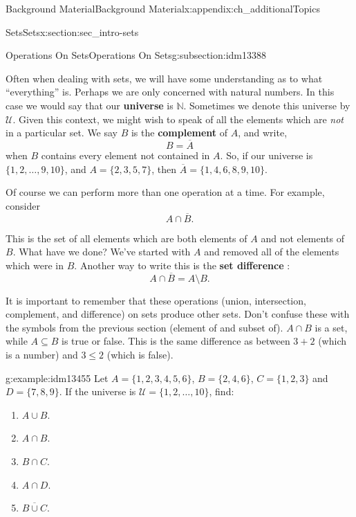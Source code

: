 \documentclass[oneside,10pt,]{book}
\newcommand{\terminology}[1]{\textbf{#1}}
\numberwithin{equation}{chapter}
\def\N{\mathbb N}
\def\U{\mathcal U}
\begin{document}
\begin{appendixptx}{Background Material}{}{Background Material}{}{}{x:appendix:ch_additionalTopics}
\begin{sectionptx}{Sets}{}{Sets}{}{}{x:section:sec_intro-sets}
\begin{subsectionptx}{Operations On Sets}{}{Operations On Sets}{}{}{g:subsection:idm13388}
\par
Often when dealing with sets, we will have some understanding as to what ``everything'' is. Perhaps we are only concerned with natural numbers. In this case we would say that our \terminology{universe} is \(\N\). Sometimes we denote this universe by \(\U\). Given this context, we might wish to speak of all the elements which are \emph{not} in a particular set. We say \(B\) is the \terminology{complement}  of \(A\), and write,%
\begin{equation*}
B = \overline A
\end{equation*}
when \(B\) contains every element not contained in \(A\). So, if our universe is \(\{1, 2,\ldots, 9, 10\}\), and \(A = \{2, 3, 5, 7\}\), then \(\overline A = \{1, 4, 6, 8, 9,10\}\).%
\par
Of course we can perform more than one operation at a time. For example, consider%
\begin{equation*}
A \cap \overline B.
\end{equation*}
%
\par
This is the set of all elements which are both elements of \(A\) and not elements of \(B\). What have we done? We've started with \(A\) and removed all of the elements which were in \(B\). Another way to write this is the \terminology{set difference}  :%
\begin{equation*}
A \cap \overline B = A \setminus B.
\end{equation*}
%
\par
It is important to remember that these operations (union, intersection, complement, and difference) on sets produce other sets. Don't confuse these with the symbols from the previous section (element of and subset of). \(A \cap B\) is a set, while \(A \subseteq B\) is true or false. This is the same difference as between \(3 + 2\) (which is a number) and \(3 \le 2\) (which is false).%
\begin{example}{}{g:example:idm13455}%
Let \(A = \{1, 2, 3, 4, 5, 6\}\), \(B = \{2, 4, 6\}\), \(C = \{1, 2, 3\}\) and \(D = \{7, 8, 9\}\). If the universe is \(\U = \{1, 2, \ldots, 10\}\), find:%
\begin{enumerate}
\item{}\(A \cup B\).%
\item{}\(A \cap B\).%
\item{}\(B \cap C\).%
\item{}\(A \cap D\).%
\item{}\(\overline{B \cup C}\).%

\end{enumerate}
\end{example}
\end{subsectionptx}
\end{sectionptx}
\end{appendixptx}
\end{document}
